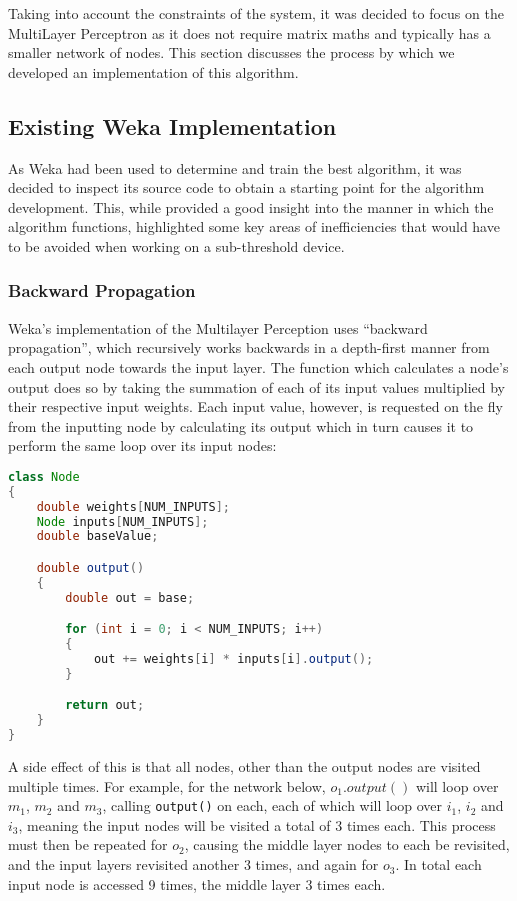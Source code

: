 
Taking into account the constraints of the system, it was decided to focus on the MultiLayer Perceptron as it does not require matrix maths and typically has a smaller network of nodes. This section discusses the process by which we developed an implementation of this algorithm.

\subsection{Existing Weka Implementation \label{sec:weka-code}}

As Weka had been used to determine and train the best algorithm, it was decided to inspect its source code to obtain a starting point for the algorithm development. This, while provided a good insight into the manner in which the algorithm functions, highlighted some key areas of inefficiencies that would have to be avoided when working on a sub-threshold device.

\subsubsection{Backward Propagation}

Weka's implementation of the Multilayer Perception uses ``backward propagation'', which recursively works backwards in a depth-first manner from each output node towards the input layer. The function which calculates a node's output does so by taking the summation of each of its input values multiplied by their respective input weights. Each input value, however, is requested on the fly from the inputting node by calculating its output which in turn causes it to perform the same loop over its input nodes:

\begin{lstlisting}[language=Java,caption={Weka's method of calculating a node's output}]
class Node
{
    double weights[NUM_INPUTS];
    Node inputs[NUM_INPUTS];
    double baseValue;

    double output()
    {
        double out = base;

        for (int i = 0; i < NUM_INPUTS; i++)
        {
            out += weights[i] * inputs[i].output();
        }

        return out;
    }
}
\end{lstlisting}

A side effect of this is that all nodes, other than the output nodes are visited multiple times. For example, for the network below, $o_1.output()$ will loop over $m_1$, $m_2$ and $m_3$, calling \verb|output()| on each, each of which will loop over $i_1$, $i_2$ and $i_3$, meaning the input nodes will be visited a total of 3 times each. This process must then be repeated for $o_2$, causing the middle layer nodes to each be revisited, and the input layers revisited another 3 times, and again for $o_3$. In total each input node is accessed 9 times, the middle layer 3 times each.

